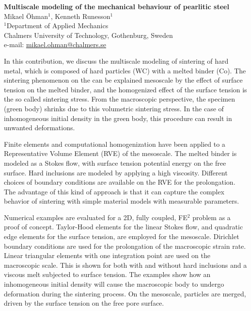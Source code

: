 \documentclass[11pt,a4paper]{article}
\begin{document}
\begin{center}

\textbf{\Large Multiscale modeling of the mechanical behaviour of pearlitic steel}
\\[5mm]

\textrm{\large Mikael Öhman${}_{}^{1}$, Kenneth Runesson${}_{}^{1}$}
\\[5mm]

\textrm{${}_{}^{1}$Department of Applied Mechanics\\
Chalmers University of Technology, Gothenburg, Sweden\\
e-mail: \url{mikael.ohman@chalmers.se}}
\\[5mm]
\end{center}

In this contribution, we discuss the multiscale modeling of sintering of hard metal, which is composed of hard particles (WC) with a melted binder (Co).
The sintering phenomenon on the can be explained mesoscale by the effect of surface tension on the melted binder, and
the homogenized effect of the surface tension is the so called sintering stress.
From the macroscopic perspective, the specimen (green body) shrinks due to this volumetric sintering stress. In the case of inhomogeneous
initial density in the green body, this procedure can result in unwanted deformations.


Finite elements and computational homogenization have been applied to a Representative Volume Element (RVE) of the mesoscale.
The melted binder is modeled as a Stokes flow, with surface tension potential energy on the free surface. Hard inclusions are modeled by applying a high viscosity.
Different choices of boundary conditions are available on the RVE for the prolongation.
The advantage of this kind of approach is that it can capture the complex behavior of sintering with simple material models with measurable parameters.

Numerical examples are evaluated for a 2D, fully coupled, FE$^2$ problem as a proof of concept.
Taylor-Hood elements for the linear Stokes flow, and quadratic edge elements for the surface tension, are employed for the mesoscale.
Dirichlet boundary conditions are used for the prolongation of the macroscopic strain rate.
Linear triangular elements with one integration point are used on the macroscopic scale.
This is shown for both with and without hard inclusions and a viscous melt subjected to surface tension.
The examples show how an inhomogeneous initial density will cause the macroscopic body to
undergo deformation
during the sintering process.
On the mesoscale, particles are merged, driven by the surface tension on the free pore surface.
\end{document}
